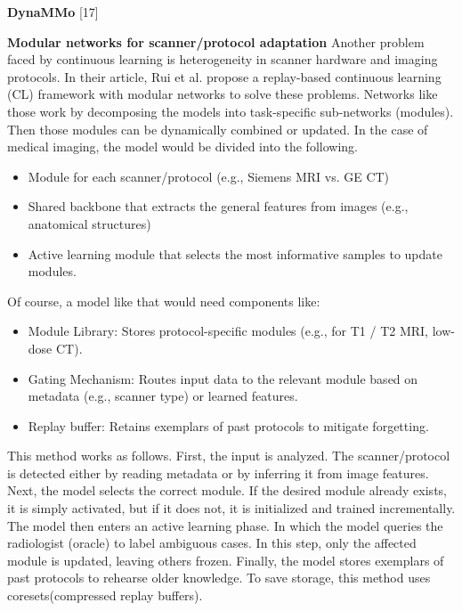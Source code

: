 \documentclass{IEEEcsmag}
\begin{document}
    \textbf{DynaMMo} [17]
    
    \textbf{Modular networks for scanner/protocol adaptation} Another problem faced by continuous learning is heterogeneity in scanner hardware and imaging protocols.
    In their article, Rui et al.\cite{cite-19} propose a replay-based continuous learning (CL) framework with modular networks to solve these problems.
    Networks like those work by decomposing the models into task-specific sub-networks (modules).
    Then those modules can be dynamically combined or updated.
    In the case of medical imaging, the model would be divided into the following.
    \begin{itemize}
        \item Module for each scanner/protocol (e.g., Siemens MRI vs. GE CT)
        \item Shared backbone that extracts the general features from images (e.g., anatomical structures)
        \item Active learning module that selects the most informative samples to update modules.
    \end{itemize}
    Of course, a model like that would need components like: 
    \begin{itemize}
        \item Module Library: Stores protocol-specific modules (e.g., for T1 / T2 MRI, low-dose CT).
        \item Gating Mechanism: Routes input data to the relevant module based on metadata (e.g., scanner type) or learned features.
        \item Replay buffer: Retains exemplars of past protocols to mitigate forgetting.
    \end{itemize}
    This method works as follows.
    First, the input is analyzed.
    The scanner/protocol is detected either by reading metadata or by inferring it from image features.
    Next, the model selects the correct module.
    If the desired module already exists, it is simply activated, but if it does not, it is initialized and trained incrementally.
    The model then enters an active learning phase.
    In which the model queries the radiologist (oracle) to label ambiguous cases.
    In this step, only the affected module is updated, leaving others frozen.
    Finally, the model stores exemplars of past protocols to rehearse older knowledge.
    To save storage, this method uses coresets(compressed replay buffers).
\end{document}
